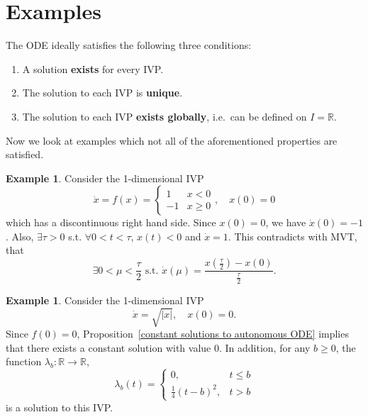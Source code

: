 \documentclass[12pt]{report}
\theoremstyle{definition}
\begin{document}
\section{Examples}

The ODE ideally satisfies the following three conditions:
\begin{enumerate}[label = (\roman*)]
    \item A solution \textbf{exists} for every IVP.
    \item The solution to each IVP is \textbf{unique}.
    \item The solution to each IVP \textbf{exists globally},
        i.e.\ can be defined on $I=\mathbb{R}$.
\end{enumerate} 
Now we look at examples which not all of the aforementioned properties are
satisfied.

\newtheorem{No solution to an IVP}[theorem]{Example}
\begin{No solution to an IVP}
    Consider the 1-dimensional IVP
    \[
        \dot{x}=f(x)=
        \begin{cases}
            1 & x<0 \\
            -1 & x\ge 0
        \end{cases},\quad x(0)=0
    \]
    which has a discontinuous right hand side. 
    Since $x(0)=0$, we have $\dot{x}(0)=-1$.
    Also, $\exists \tau>0$ s.t. $\forall 0<t<\tau$, $x(t)<0$ and $\dot{x}=1$.
    This contradicts with MVT, that
    \[
        \exists 0<\mu<\frac{\tau}{2} \text{ s.t. }
        \dot{x}(\mu)=\frac{x(\frac{\tau}{2})-x(0)}{\frac{\tau}{2}}.
    \]
\end{No solution to an IVP}

\newtheorem{Many solutions to an IVP}[theorem]{Example}
\begin{Many solutions to an IVP}
    Consider the 1-dimensional IVP
    \[
        \dot{x}=\sqrt{|x|}, \quad x(0)=0.
    \]
    Since $f(0)=0$, Proposition~\ref{constant solutions to autonomous ODE}
    implies that there exists a constant solution with value 0.
    In addition, for any $b\ge 0$, the function
    $\lambda_b:\mathbb{R}\rightarrow\mathbb{R}$,
    \[
        \lambda_b(t)=
        \begin{cases}
            0, & t\le b \\
            \frac{1}{4}(t-b)^{2}, & t>b
        \end{cases} 
    \]
    is a solution to this IVP.
\end{Many solutions to an IVP}
\end{document}
